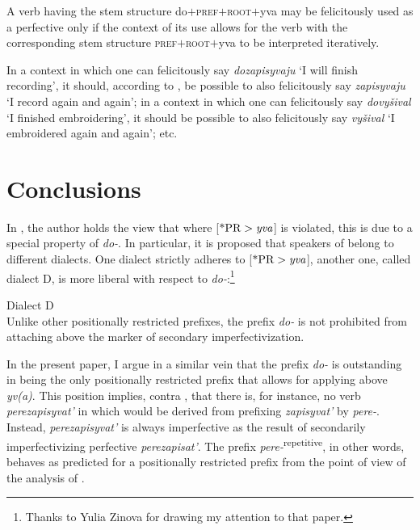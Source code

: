 \documentclass[output=paper,
colorlinks,
citecolor=brown,
newtxmath
]{langscibook}
\begin{document}

\eanoraggedright\label{ggg}
A verb having the stem structure do$+$\textsc{pref}$+$\textsc{root}$+$yva may be felicitously used as a perfective only if the context of its use allows for the verb with the corresponding stem structure \textsc{pref}$+$\textsc{root}$+$yva to be interpreted iteratively.
\z

\noindent In a context in which one can felicitously say \textit{dozapisyvaju} `I will finish recording', it should, according to , be possible to also felicitously say \textit{zapisyvaju} `I record again and again'; in a context in which one can felicitously say \textit{dovyšival} `I finished embroidering', it should be possible to also felicitously say \textit{vyšival} `I embroidered again and again'; etc.
%
%
\section{Conclusions}\label{concl}
In \citet{Tatevosov2013b}, the author holds the view that where [$\text{*PR}>\text{\textit{yva}}$] is violated, this is due to a special property of \textit{do-}. In particular, it is proposed that speakers of  belong to different dialects. One dialect strictly adheres to [$\text{*PR}>\text{\textit{yva}}$], another one, called dialect D, is more liberal with respect to \textit{do-}:\footnote{Thanks to Yulia Zinova for drawing my attention to that paper.}


\eanoraggedright
Dialect D\\Unlike other positionally restricted prefixes, the prefix \textit{do-} is not prohibited from attaching above the marker of secondary imperfectivization.
\z

\noindent In the present paper, I argue in a similar vein that the prefix \textit{do-} is outstanding in being the only positionally restricted prefix that allows for applying above \textit{yv(a)}.
This position implies, contra \citet{Zinova.Filip2015}, that there is, for instance, no verb \textit{perezapisyvat'} in  which would be
derived from prefixing  \textit{zapisyvat'} by \textit{pere-}.
Instead, \textit{perezapisyvat'} is always imperfective as the result of secondarily imperfectivizing perfective \textit{perezapisat'}. The prefix \textit{pere-}\textsuperscript{repetitive}, in other words, behaves as predicted for a positionally restricted prefix from the point of view of the analysis of \citet{Tatevosov2009,Tatevosov2013a}.
\end{document}
